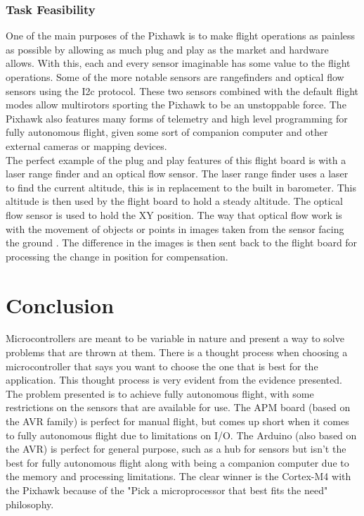 \documentclass[conference,12pt, ]{IEEEtran}
\begin{document}
\subsubsection{Task Feasibility}
One of the main purposes of the Pixhawk is to make flight operations as painless as possible by allowing as much plug and play as the market and hardware allows. With this, each and every sensor imaginable has some value to the flight operations. Some of the more notable sensors are rangefinders and optical flow sensors using the I2c protocol. These two sensors combined with the default flight modes allow multirotors sporting the Pixhawk to be an unstoppable force. The Pixhawk also features many forms of telemetry and high level programming for fully autonomous flight, given some sort of companion computer and other external cameras or mapping devices.\\
The perfect example of the plug and play features of this flight board is with a laser range finder and an optical flow sensor. The laser range finder uses a laser to find the current altitude, this is in replacement to the built in barometer. This altitude is then used by the flight board to hold a steady altitude. The optical flow sensor is used to hold the XY position. The way that optical flow work is with the movement of objects or points in images taken from the sensor facing the ground \cite{optical_flow}. The difference in the images is then sent back to the flight board for processing the change in position for compensation. 


\section{Conclusion}
Microcontrollers are meant to be variable in nature and present a way to solve problems that are thrown at them. There is a thought process when choosing a microcontroller that says you want to choose the one that is best for the application. This thought process is very evident from the evidence presented. The problem presented is to achieve fully autonomous flight, with some restrictions on the sensors that are available for use. The APM board (based on the AVR family) is perfect for manual flight, but comes up short when it comes to fully autonomous flight due to limitations on I/O. The Arduino (also based on the AVR) is perfect for general purpose, such as a hub for sensors but isn't the best for fully autonomous flight along with being a companion computer due to the memory and processing limitations. The clear winner is the Cortex-M4 with the Pixhawk because of the "Pick a microprocessor that best fits the need" philosophy. 
\end{document}
